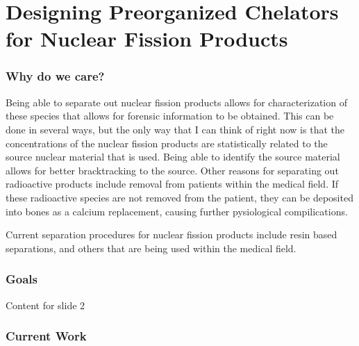 \section{Designing Preorganized Chelators for Nuclear Fission Products}


\begin{frame}
\frametitle{Why do we care?}
Being able to separate out nuclear fission products allows for characterization of these species that allows for forensic information to be obtained. This can be done in several ways, but the only way that I can think of right now is
that the concentrations of the nuclear fission products are statistically related to the source nuclear material that is used. Being able to identify the source material allows for better bracktracking to the source. Other reasons for
separating out radioactive products include removal from patients within the medical field. If these radioactive species are not removed from the patient, they can be deposited into bones as a calcium replacement, causing further
pysiological compilications. 
\end{frame}

\begin{frame}
Current separation procedures for nuclear fission products include resin based separations, and others that are being used within the medical field. 
\end{frame}


\begin{frame}
\frametitle{Goals}
Content for slide 2
\end{frame}


\begin{frame}
\frametitle{Current Work}
\end{frame}
